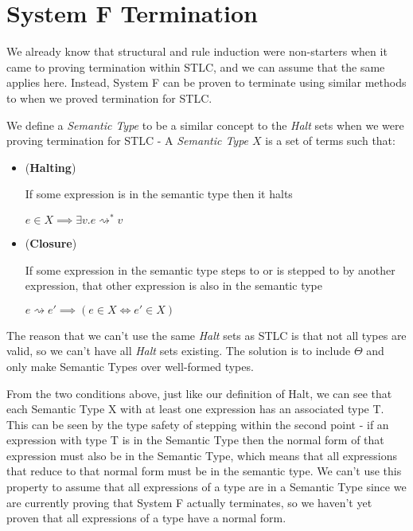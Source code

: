 \documentclass{article}
\begin{document}
\newpage
\section{System F Termination}

We already know that structural and rule induction were non-starters when it came to proving termination within STLC, and we can assume that the same applies here. Instead, System F can be proven to terminate using similar methods to when we proved termination for STLC. 

We define a \textit{Semantic Type} to be a similar concept to the \textit{Halt} sets when we were proving termination for STLC - A \textit{Semantic Type $X$} is a set of terms such that:

\begin{itemize}
    \item (\textbf{Halting})
    
    If some expression is in the semantic type then it halts
    
    $e \in  X \implies \exists v.e \rightsquigarrow^* v$
    
    \item (\textbf{Closure})
    
    If some expression in the semantic type steps to or is stepped to by another expression, that other expression is also in the semantic type
    
    $e \rightsquigarrow e' \implies (e \in X \iff e' \in X)$
\end{itemize}

The reason that we can't use the same \textit{Halt} sets as STLC is that not all types are valid, so we can't have all \textit{Halt} sets existing. The solution is to include $\Theta$ and only make Semantic Types over well-formed types.

From the two conditions above, just like our definition of Halt, we can see that each Semantic Type X with at least one expression has an associated type T. This can be seen by the type safety of stepping within the second point - if an expression with type T is in the Semantic Type then the normal form of that expression must also be in the Semantic Type, which means that all expressions that reduce to that normal form must be in the semantic type. We can't use this property to assume that all expressions of a type are in a Semantic Type since we are currently proving that System F actually terminates, so we haven't yet proven that all expressions of a type have a normal form.
\end{document}
